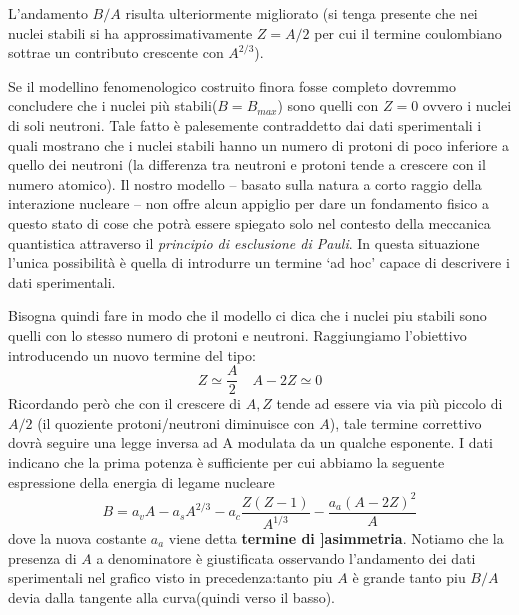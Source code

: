L'andamento \(B/A\) risulta ulteriormente migliorato (si tenga presente
che nei nuclei stabili si ha approssimativamente \(Z=A/2\) per cui il
termine coulombiano sottrae un contributo crescente con \(A^{2/3}\)).

Se il modellino fenomenologico costruito finora fosse completo dovremmo
concludere che i nuclei più stabili(\(B= B_{max}\)) sono quelli con
\(Z=0\) ovvero i nuclei di soli neutroni.
Tale fatto è palesemente
contraddetto dai dati sperimentali i quali mostrano che i nuclei stabili
hanno un numero di protoni di poco inferiore a quello dei neutroni (la
differenza tra neutroni e protoni tende a crescere con il numero
atomico).
Il nostro modello -- basato sulla natura a corto raggio della
interazione nucleare -- non offre alcun appiglio per dare un fondamento
fisico a questo stato di cose che potrà essere spiegato solo nel
contesto della meccanica quantistica attraverso il \emph{principio di
	esclusione di Pauli}.
In questa situazione l'unica possibilità è quella
di introdurre un termine `ad hoc' capace di descrivere i dati
sperimentali.

Bisogna quindi fare in modo che il modello ci dica che i nuclei piu
stabili sono quelli con lo stesso numero di protoni e neutroni.
Raggiungiamo l'obiettivo introducendo un nuovo termine del tipo:
\[
	Z \simeq \frac{A}{2} \quad A - 2Z \simeq 0
\]
Ricordando però che con il crescere di \(A, Z\) tende ad essere via
via più piccolo di \(A/2\) (il quoziente protoni/neutroni diminuisce con
\(A\)), tale termine correttivo dovrà seguire una legge inversa ad A
modulata da un qualche esponente.
I dati indicano che la prima potenza è
sufficiente per cui abbiamo la seguente espressione della energia di
legame nucleare
\[
	B = a_{v}A - a_{s}A^{2/3} - a_{c} \frac{Z(Z-1)}{A^{1/3}} - \frac{a_{a}(A-2Z)^{2}}{A}
\]
dove la nuova costante \(a_{a}\) viene detta \textbf{termine di ]asimmetria}.
Notiamo che la presenza di \(A\) a denominatore è
giustificata osservando l'andamento dei dati sperimentali nel grafico
visto in precedenza:tanto piu \(A\) è grande tanto piu \(B / A\) devia
dalla tangente alla curva(quindi verso il basso).

